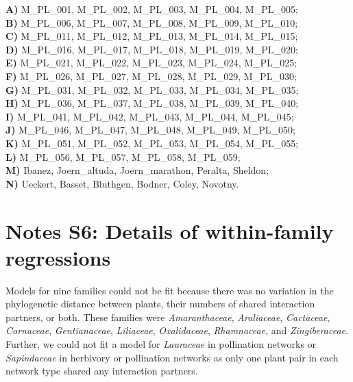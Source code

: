 \documentclass[12pt]{article}
\begin{document}
\begin{spacing}{1.5}
    \noindent \textbf{A)} M\_PL\_001, M\_PL\_002, M\_PL\_003, M\_PL\_004, M\_PL\_005;      \\
    \textbf{B)} M\_PL\_006, M\_PL\_007, M\_PL\_008, M\_PL\_009, M\_PL\_010;    \\
    \textbf{C)} M\_PL\_011, M\_PL\_012, M\_PL\_013, M\_PL\_014, M\_PL\_015;  \\
    \textbf{D)} M\_PL\_016, M\_PL\_017, M\_PL\_018, M\_PL\_019, M\_PL\_020;   \\
    \textbf{E)} M\_PL\_021, M\_PL\_022, M\_PL\_023, M\_PL\_024, M\_PL\_025;  \\
    \textbf{F)} M\_PL\_026, M\_PL\_027, M\_PL\_028, M\_PL\_029, M\_PL\_030;  \\
    \textbf{G)} M\_PL\_031, M\_PL\_032, M\_PL\_033, M\_PL\_034, M\_PL\_035; \\
    \textbf{H)} M\_PL\_036, M\_PL\_037, M\_PL\_038, M\_PL\_039, M\_PL\_040;   \\
    \textbf{I)} M\_PL\_041, M\_PL\_042, M\_PL\_043, M\_PL\_044, M\_PL\_045;\\
    \textbf{J)} M\_PL\_046, M\_PL\_047, M\_PL\_048, M\_PL\_049, M\_PL\_050;  \\
    \textbf{K)} M\_PL\_051, M\_PL\_052, M\_PL\_053, M\_PL\_054, M\_PL\_055;   \\
    \textbf{L)} M\_PL\_056, M\_PL\_057, M\_PL\_058, M\_PL\_059;  \\
    \textbf{M)} Ibanez, Joern\_altuda, Joern\_marathon, Peralta, Sheldon;  \\
    \textbf{N)} Ueckert, Basset, Bluthgen, Bodner, Coley, Novotny.

\clearpage

\section*{Notes S6: Details of within-family regressions}

    Models for nine families could not be fit because there was no variation in the phylogenetic distance between plants, their numbers of shared interaction partners, or both. These families were \emph{Amaranthaceae}, \emph{Araliaceae}, \emph{Cactaceae}, \emph{Cornaceae}, \emph{Gentianaceae}, \emph{Liliaceae}, \emph{Oxalidaceae}, \emph{Rhamnaceae}, and \emph{Zingiberaceae}. Further, we could not fit a model for \emph{Lauraceae} in pollination networks or \emph{Sapindaceae} in herbivory or pollination networks as only one plant pair in each network type shared any interaction partners.



\end{spacing}
\end{document}
